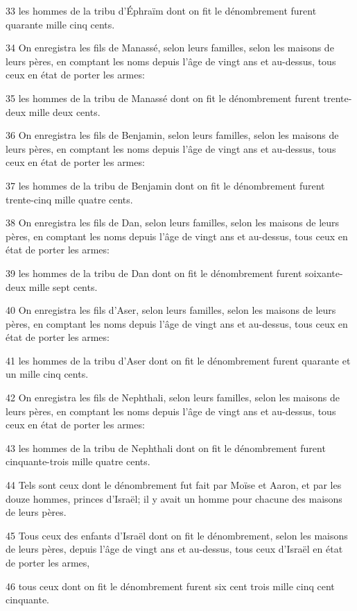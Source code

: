 \par 33 les hommes de la tribu d'Éphraïm dont on fit le dénombrement furent quarante mille cinq cents.
\par 34 On enregistra les fils de Manassé, selon leurs familles, selon les maisons de leurs pères, en comptant les noms depuis l'âge de vingt ans et au-dessus, tous ceux en état de porter les armes:
\par 35 les hommes de la tribu de Manassé dont on fit le dénombrement furent trente-deux mille deux cents.
\par 36 On enregistra les fils de Benjamin, selon leurs familles, selon les maisons de leurs pères, en comptant les noms depuis l'âge de vingt ans et au-dessus, tous ceux en état de porter les armes:
\par 37 les hommes de la tribu de Benjamin dont on fit le dénombrement furent trente-cinq mille quatre cents.
\par 38 On enregistra les fils de Dan, selon leurs familles, selon les maisons de leurs pères, en comptant les noms depuis l'âge de vingt ans et au-dessus, tous ceux en état de porter les armes:
\par 39 les hommes de la tribu de Dan dont on fit le dénombrement furent soixante-deux mille sept cents.
\par 40 On enregistra les fils d'Aser, selon leurs familles, selon les maisons de leurs pères, en comptant les noms depuis l'âge de vingt ans et au-dessus, tous ceux en état de porter les armes:
\par 41 les hommes de la tribu d'Aser dont on fit le dénombrement furent quarante et un mille cinq cents.
\par 42 On enregistra les fils de Nephthali, selon leurs familles, selon les maisons de leurs pères, en comptant les noms depuis l'âge de vingt ans et au-dessus, tous ceux en état de porter les armes:
\par 43 les hommes de la tribu de Nephthali dont on fit le dénombrement furent cinquante-trois mille quatre cents.
\par 44 Tels sont ceux dont le dénombrement fut fait par Moïse et Aaron, et par les douze hommes, princes d'Israël; il y avait un homme pour chacune des maisons de leurs pères.
\par 45 Tous ceux des enfants d'Israël dont on fit le dénombrement, selon les maisons de leurs pères, depuis l'âge de vingt ans et au-dessus, tous ceux d'Israël en état de porter les armes,
\par 46 tous ceux dont on fit le dénombrement furent six cent trois mille cinq cent cinquante.
